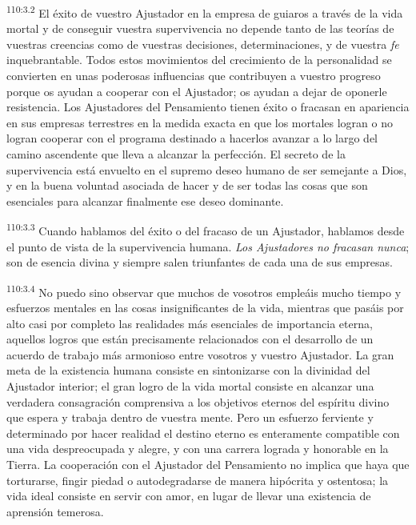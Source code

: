 \documentclass[twoside, 11pt]{book}
\begin{document}
\par
\textsuperscript{110:3.2} El éxito de vuestro Ajustador en la empresa de guiaros a través de la vida mortal y de conseguir vuestra supervivencia no depende tanto de las teorías de vuestras creencias como de vuestras decisiones, determinaciones, y de vuestra \textit{fe} inquebrantable. Todos estos movimientos del crecimiento de la personalidad se convierten en unas poderosas influencias que contribuyen a vuestro progreso porque os ayudan a cooperar con el Ajustador; os ayudan a dejar de oponerle resistencia. Los Ajustadores del Pensamiento tienen éxito o fracasan en apariencia en sus empresas terrestres en la medida exacta en que los mortales logran o no logran cooperar con el programa destinado a hacerlos avanzar a lo largo del camino ascendente que lleva a alcanzar la perfección. El secreto de la supervivencia está envuelto en el supremo deseo humano de ser semejante a Dios, y en la buena voluntad asociada de hacer y de ser todas las cosas que son esenciales para alcanzar finalmente ese deseo dominante.

\par
\textsuperscript{110:3.3} Cuando hablamos del éxito o del fracaso de un Ajustador, hablamos desde el punto de vista de la supervivencia humana. \textit{Los Ajustadores no fracasan nunca}; son de esencia divina y siempre salen triunfantes de cada una de sus empresas.

\par
\textsuperscript{110:3.4} No puedo sino observar que muchos de vosotros empleáis mucho tiempo y esfuerzos mentales en las cosas insignificantes de la vida, mientras que pasáis por alto casi por completo las realidades más esenciales de importancia eterna, aquellos logros que están precisamente relacionados con el desarrollo de un acuerdo de trabajo más armonioso entre vosotros y vuestro Ajustador. La gran meta de la existencia humana consiste en sintonizarse con la divinidad del Ajustador interior; el gran logro de la vida mortal consiste en alcanzar una verdadera consagración comprensiva a los objetivos eternos del espíritu divino que espera y trabaja dentro de vuestra mente. Pero un esfuerzo ferviente y determinado por hacer realidad el destino eterno es enteramente compatible con una vida despreocupada y alegre, y con una carrera lograda y honorable en la Tierra. La cooperación con el Ajustador del Pensamiento no implica que haya que torturarse, fingir piedad o autodegradarse de manera hipócrita y ostentosa; la vida ideal consiste en servir con amor, en lugar de llevar una existencia de aprensión temerosa.
\end{document}
